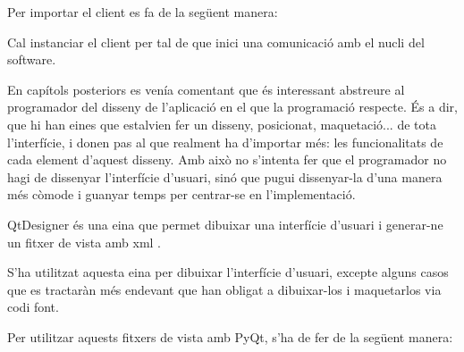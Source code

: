 \documentclass[letterpaper,11pt,catalan]{sphinxmanual}
\begin{document}
Per importar el client es fa de la següent manera:

\begin{sphinxVerbatim}[commandchars=\\\{\}]
   
  
\end{sphinxVerbatim}

Cal instanciar el client per tal de que inici una comunicació amb el nucli del software.

En capítols posteriors es venía comentant que és interessant abstreure al programador del disseny
de l'aplicació en el que la programació respecte. És a dir, que hi han eines que estalvien
fer un disseny, posicionat, maquetació... de tota l'interfície, i donen pas al que realment
ha d'importar més: les funcionalitats de cada element d'aquest disseny. Amb això no s'intenta
fer que el programador no hagi de dissenyar l'interfície d'usuari, sinó que pugui dissenyar-la
d'una manera més còmode i guanyar temps per centrar-se en l'implementació.

QtDesigner és una eina que permet dibuixar una interfície d'usuari i generar-ne un fitxer
de vista amb xml .

S'ha utilitzat aquesta eina per dibuixar l'interfície d'usuari, excepte alguns casos que
es tractaràn més endevant que han obligat a dibuixar-los i maquetarlos via codi font.


Per utilitzar aquests fitxers de vista amb PyQt, s'ha de fer de la següent manera:

\begin{sphinxVerbatim}[commandchars=\\\{\}]
 
     
         
         
\end{sphinxVerbatim}
\end{document}
